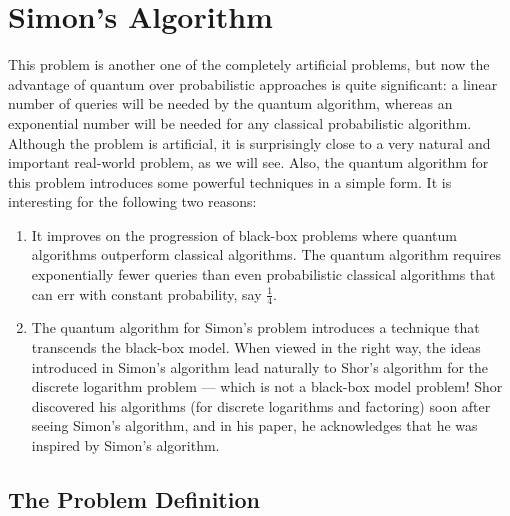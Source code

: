 \chapter{Simon's Algorithm}
This problem is another one of the completely artificial problems, but now the advantage of quantum over probabilistic approaches is quite significant: a linear number of queries will be needed by the quantum algorithm, whereas an exponential number will be needed for any classical probabilistic algorithm. Although the problem is artificial, it is surprisingly close to a very natural and important real-world problem, as we will see. Also, the quantum algorithm for this problem introduces some powerful techniques in a simple form. It is interesting for the following two reasons:

\begin{enumerate}
    \item It improves on the progression of black-box problems where quantum algorithms outperform classical algorithms. The quantum algorithm requires exponentially fewer queries than even probabilistic classical algorithms that can err with constant probability, say $\frac{1}{4}$.
    
    \item The quantum algorithm for Simon's problem introduces a technique that transcends the black-box model. When viewed in the right way, the ideas introduced in Simon's algorithm lead naturally to Shor's algorithm for the discrete logarithm problem — which is not a black-box model problem! Shor discovered his algorithms (for discrete logarithms and factoring) soon after seeing Simon's algorithm, and in his paper, he acknowledges that he was inspired by Simon's algorithm.
\end{enumerate}

\section{The Problem Definition}

